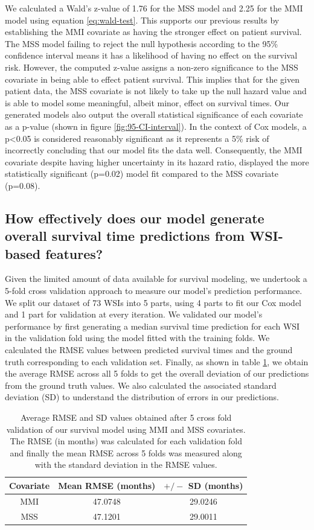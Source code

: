 \documentclass{l4proj}
\begin{document}
We calculated a Wald's z-value of 1.76 for the MSS model and 2.25 for the MMI model using equation \ref{eq:wald-test}. This supports our previous results by establishing the MMI covariate as having the stronger effect on patient survival. The MSS model failing to reject the null hypothesis according to the 95\% confidence interval means it has a likelihood of having no effect on the survival risk. However, the computed z-value assigns a non-zero significance to the MSS covariate in being able to effect patient survival. This implies that for the given patient data, the MSS covariate is not likely to take up the null hazard value and is able to model some meaningful, albeit minor, effect on survival times. Our generated models also output the overall statistical significance of each covariate as a p-value (shown in figure \ref{fig:95-CI-interval}). In the context of Cox models, a p<0.05 is considered reasonably significant as it represents a 5\% risk of incorrectly concluding that our model fits the data well. Consequently, the MMI covariate despite having higher uncertainty in its hazard ratio, displayed the more statistically significant (p=0.02) model fit compared to the MSS covariate (p=0.08).

\subsection{How effectively does our model generate overall survival time predictions from WSI-based features?}
Given the limited amount of data available for survival modeling, we  undertook a 5-fold cross validation approach to measure our model's prediction performance. We split our dataset of 73 WSIs into 5 parts, using 4 parts to fit our Cox model and 1 part for validation at every iteration. We validated our model's performance by first generating a median survival time prediction for each WSI in the validation fold using the model fitted with the training folds. We calculated the RMSE values between predicted survival times and the ground truth corresponding to each validation set. Finally, as shown in table \ref{tab:cross-val-results},  we obtain the average RMSE across all 5 folds to get the overall deviation of our predictions from the ground truth values. We also calculated the associated standard deviation (SD) to understand the distribution of errors in our predictions.   

\begin{table}[h]
    \centering
    \begin{tabular}{c|c|c}
    \hline
     Covariate & Mean RMSE (months) & \(+/-\) SD (months)   \\ \hline
     MMI & 47.0748 & 29.0246 \\
     MSS & 47.1201 & 29.0011 \\
    \end{tabular}
    \caption{Average RMSE and SD values obtained after 5 cross fold validation of our survival model using MMI and MSS covariates. The RMSE (in months) was calculated for each validation fold and finally the mean RMSE across 5 folds was measured along with the standard deviation in the RMSE values.}
    \label{tab:cross-val-results}
\end{table}
\end{document}
